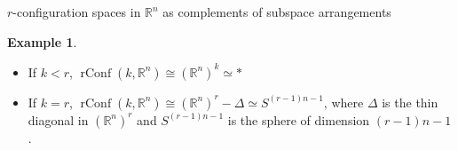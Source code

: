 \documentclass[12pt]{amsart}
\newcommand{\R}{{\mathbb R}}
\newcommand{\Conf}{\operatorname{Conf}}
\newcommand{\rConf}{\operatorname{rConf}}
\theoremstyle{plain}
\theoremstyle{definition}
\newtheorem{defin}[thm]{Definition}
\newtheorem{example}[thm]{Example}
\theoremstyle{remark}
\begin{document}
\begin{section}{$r$-configuration spaces in $\mathbb R^n$ as complements of subspace arrangements}
\begin{example}\hspace*{10cm}
\begin{itemize}
\item If $k<r$, $\rConf(k,\R^n) \cong (\R^n)^k \simeq *$

\item If $k=r$, $\rConf(k,\R^n) \cong (\R^n)^r - \Delta \simeq S^{(r-1)n-1}$, where $\Delta$ is the thin diagonal in $ (\R^n)^r$ and $S^{(r-1)n-1}$ is the sphere of dimension $(r-1)n-1$.

\end{itemize}
\end{example}






\end{section}
\end{document}
